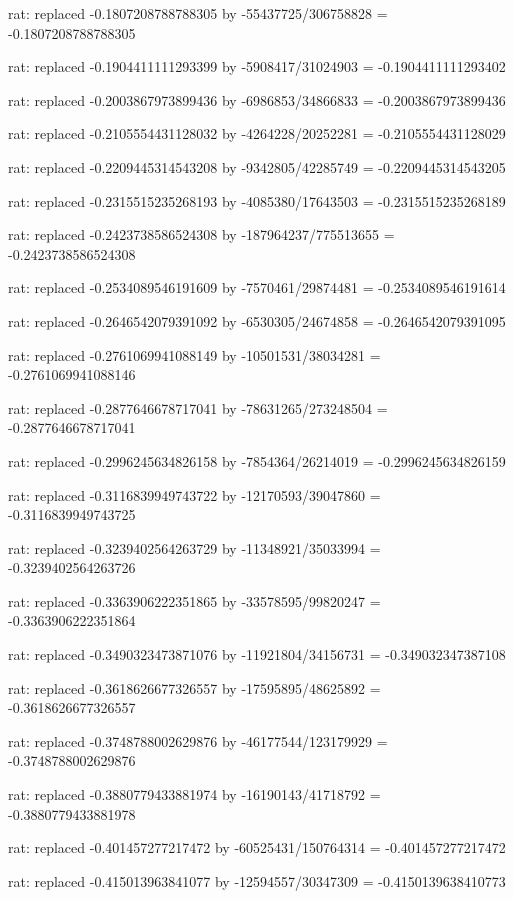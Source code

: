 \documentclass[a4paper,10pt]{article}
\begin{document}
\begin{eulernotebook}
\begin{eulercomment}
\begin{eulercomment}
\begin{eulercomment}
\begin{eulercomment}
\begin{eulercomment}
\begin{eulercomment}
\begin{eulercomment}
\begin{eulercomment}
\begin{eulercomment}
\begin{eulercomment}
\begin{eulercomment}
\begin{eulercomment}
\begin{eulercomment}
\begin{eulercomment}
\begin{eulercomment}
\begin{eulercomment}
\begin{euleroutput}
  rat: replaced -0.1807208788788305 by -55437725/306758828 = -0.1807208788788305
  
  rat: replaced -0.1904411111293399 by -5908417/31024903 = -0.1904411111293402
  
  rat: replaced -0.2003867973899436 by -6986853/34866833 = -0.2003867973899436
  
  rat: replaced -0.2105554431128032 by -4264228/20252281 = -0.2105554431128029
  
  rat: replaced -0.2209445314543208 by -9342805/42285749 = -0.2209445314543205
  
  rat: replaced -0.2315515235268193 by -4085380/17643503 = -0.2315515235268189
  
  rat: replaced -0.2423738586524308 by -187964237/775513655 = -0.2423738586524308
  
  rat: replaced -0.2534089546191609 by -7570461/29874481 = -0.2534089546191614
  
  rat: replaced -0.2646542079391092 by -6530305/24674858 = -0.2646542079391095
  
  rat: replaced -0.2761069941088149 by -10501531/38034281 = -0.2761069941088146
  
  rat: replaced -0.2877646678717041 by -78631265/273248504 = -0.2877646678717041
  
  rat: replaced -0.2996245634826158 by -7854364/26214019 = -0.2996245634826159
  
  rat: replaced -0.3116839949743722 by -12170593/39047860 = -0.3116839949743725
  
  rat: replaced -0.3239402564263729 by -11348921/35033994 = -0.3239402564263726
  
  rat: replaced -0.3363906222351865 by -33578595/99820247 = -0.3363906222351864
  
  rat: replaced -0.3490323473871076 by -11921804/34156731 = -0.349032347387108
  
  rat: replaced -0.3618626677326557 by -17595895/48625892 = -0.3618626677326557
  
  rat: replaced -0.3748788002629876 by -46177544/123179929 = -0.3748788002629876
  
  rat: replaced -0.3880779433881974 by -16190143/41718792 = -0.3880779433881978
  
  rat: replaced -0.401457277217472 by -60525431/150764314 = -0.401457277217472
  
  rat: replaced -0.415013963841077 by -12594557/30347309 = -0.4150139638410773
  

\end{euleroutput}
\end{eulercomment}
\end{eulercomment}
\end{eulercomment}
\end{eulercomment}
\end{eulercomment}
\end{eulercomment}
\end{eulercomment}
\end{eulercomment}
\end{eulercomment}
\end{eulercomment}
\end{eulercomment}
\end{eulercomment}
\end{eulercomment}
\end{eulercomment}
\end{eulercomment}
\end{eulercomment}
\end{eulernotebook}
\end{document}
